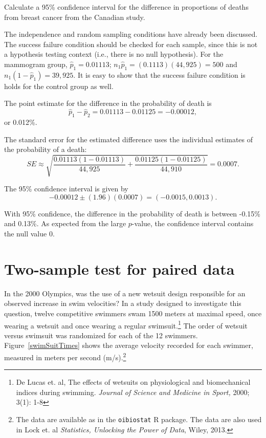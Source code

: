 \begin{examplewrap}
\begin{nexample}{Calculate a 95\% confidence interval for the difference in proportions of deaths from breast cancer from the Canadian study.}\label{mammogramExConfInt}%

The independence and random sampling conditions have already been discussed.  The success failure condition should be checked for each sample, since this is not a hypothesis testing context (i.e., there is no null hypothesis). For the mammogram group, $\hat{p}_1 = 0.01113$; $n_1 \hat{p}_1 = (0.1113)(44,925) = 500$ and $n_1 (1 - \hat{p}_1) = 39,925.$ It is easy to show that the success failure condition is holds for the control group as well.

The point estimate for the difference in the probability of death is
$$\hat{p}_{1} - \hat{p}_{2} = 0.01113 - 0.01125 = -0.00012,$$ or 0.012\%.

The standard error for the estimated difference uses the individual estimates of the probability of a death:
$$SE \approx \sqrt{\frac{0.01113(1-0.01113)}{44,925} + \frac{0.01125(1-0.01125)}{44,910}} = 0.0007. $$

The 95\% confidence interval is given by 
$$ -0.00012 \pm (1.96) (0.0007) = (-0.0015, 0.0013).$$

With 95\% confidence, the difference in the probability of death is between -0.15\% and 0.13\%. As expected from the large $p$-value, the confidence interval contains the null value 0.
\end{nexample}
\end{examplewrap}





\section{Two-sample test for paired data}
\label{pairedData}


In the 2000 Olympics, was the use of a new wetsuit design responsible for an observed increase in swim velocities? In a study designed to investigate this question, twelve competitive swimmers swam 1500 meters at maximal speed, once wearing a wetsuit and once wearing a regular swimsuit.\footnote{De Lucas et. al, The effects of wetsuits on physiological and biomechanical indices during swimming. \textit{Journal of Science and Medicine in Sport,} 2000; 3(1): 1-8} The order of wetsuit versus swimsuit was randomized for each of the 12 swimmers. Figure~\ref{swimSuitTimes} shows the average velocity recorded for each swimmer, measured in meters per second (m/s).\footnote{The data are available as  in the \texttt{oibiostat} \textsf{R} package. The data are also used in Lock et. al \textit{Statistics, Unlocking the Power of Data}, Wiley, 2013.}

